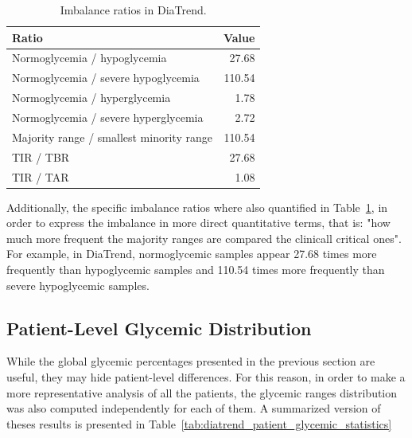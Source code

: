 \begin{table}[htbp]
    \centering
    \caption{Imbalance ratios in DiaTrend.}
    \label{tab:diatrend_imbalance_ratios}
    \begin{tabular}{lr}
        \hline
        \textbf{Ratio} & \textbf{Value} \\
        \hline
        Normoglycemia / hypoglycemia & 27.68 \\
        Normoglycemia / severe hypoglycemia & 110.54 \\
        Normoglycemia / hyperglycemia & 1.78 \\
        Normoglycemia / severe hyperglycemia & 2.72 \\
        Majority range / smallest minority range & 110.54 \\
        \hline
        TIR / TBR & 27.68 \\
        TIR / TAR & 1.08 \\
        \hline
    \end{tabular}
\end{table}

Additionally, the specific imbalance ratios where also quantified in Table~\ref{tab:diatrend_imbalance_ratios}, in order to express the imbalance in more direct quantitative terms, that is: "how much more frequent the majority ranges are compared the clinicall critical ones". For example, in DiaTrend, normoglycemic samples appear 27.68 times more frequently than hypoglycemic samples and 110.54 times more frequently than severe hypoglycemic samples.

\subsection{Patient-Level Glycemic Distribution}
\label{subsec:diatrend_patient_level}

While the global glycemic percentages presented in the previous section are useful, they may hide patient-level differences. For this reason, in order to make a more representative analysis of all the patients, the glycemic ranges distribution was also computed independently for each of them. A summarized version of theses results is presented in Table~\ref{tab:diatrend_patient_glycemic_statistics}

